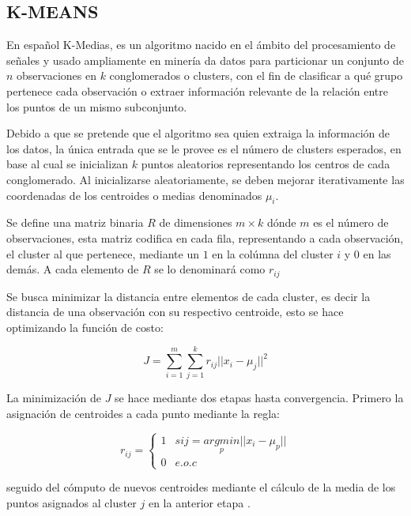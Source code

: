         \subsection{K-MEANS}
        	En español K-Medias, es un algoritmo nacido en el ámbito del procesamiento de señales y usado ampliamente en minería da datos para particionar un conjunto de $n$ observaciones en $k$ conglomerados o clusters, con el fin de clasificar a qué grupo pertenece cada observación o extraer información relevante de la relación entre los puntos de un mismo subconjunto.
        	
        	Debido a que se pretende que el algoritmo sea quien extraiga la información de los datos, la única entrada que se le provee es el número de clusters esperados, en base al cual se inicializan $k$ puntos aleatorios representando los centros de cada conglomerado. Al inicializarse aleatoriamente, se deben mejorar iterativamente las coordenadas de los centroides o medias denominados $\mu_i$.
        	
        	Se define una matriz binaria $R$ de dimensiones $m\times k$ dónde $m$ es el número de observaciones, esta matriz codifica en cada fila, representando a cada observación, el cluster al que pertenece, mediante un $1$ en la colúmna del cluster $i$ y $0$ en las demás. A cada elemento de $R$ se lo denominará como $r_{ij}$
        	
        	Se busca minimizar la distancia entre elementos de cada cluster, es decir la distancia de una observación con su respectivo centroide, esto se hace optimizando la función de costo:
        	
        	\begin{equation}
        		J = \sum_{i=1}^m\sum_{j=1}^k r_{ij}||x_i - \mu_j||^2
        	\end{equation}
        	
        	La minimización de $J$ se hace mediante dos etapas hasta convergencia. Primero la asignación de centroides a cada punto mediante la regla:
        	
        	\begin{equation}
        		r_{ij} = 
        		\begin{cases}
        			1 & si j = \underset{p}{argmin}||x_i - \mu_p||\\
        			0 & e.o.c
        		\end{cases}
        	\end{equation}
        
        	seguido del cómputo de nuevos centroides mediante el cálculo de la media de los puntos asignados al cluster $j$ en la anterior etapa \citep{bishop}.
        	
